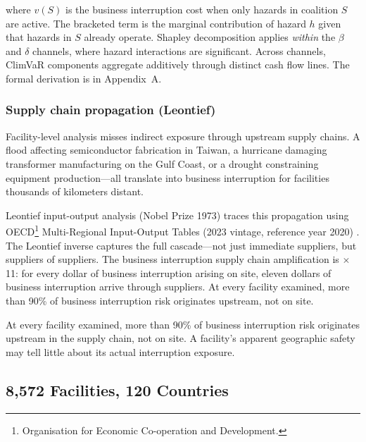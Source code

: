 \begin{twocolbody}
\noindent where $v(S)$ is the business interruption cost when only hazards in coalition $S$ are active. The bracketed term is the marginal contribution of hazard $h$ given that hazards in $S$ already operate. Shapley decomposition applies \textit{within} the $\beta$ and $\delta$ channels, where hazard interactions are significant. Across channels, ClimVaR components aggregate additively through distinct cash flow lines. The formal derivation is in Appendix~A.

\subsubsection*{Supply chain propagation (Leontief)}

Facility-level analysis misses indirect exposure through upstream supply chains. A flood affecting semiconductor fabrication in Taiwan, a hurricane damaging transformer manufacturing on the Gulf Coast, or a drought constraining equipment production---all translate into business interruption for facilities thousands of kilometers distant.

Leontief input-output analysis (Nobel Prize 1973) traces this propagation using OECD\footnote{Organisation for Economic Co-operation and Development.} Multi-Regional Input-Output Tables (2023 vintage, reference year 2020) \citep{miller2009inputoutput}. The Leontief inverse captures the full cascade---not just immediate suppliers, but suppliers of suppliers. The business interruption supply chain amplification is $\times$11: for every dollar of business interruption arising on site, eleven dollars of business interruption arrive through suppliers. At every facility examined, more than 90\% of business interruption risk originates upstream, not on site.

\end{twocolbody}

\begin{pullquote}
At every facility examined, more than 90\% of business interruption risk originates upstream in the supply chain, not on site. A facility's apparent geographic safety may tell little about its actual interruption exposure.
\end{pullquote}

\subsection*{8,572 Facilities, 120 Countries}\label{toc:database}
\greensep

